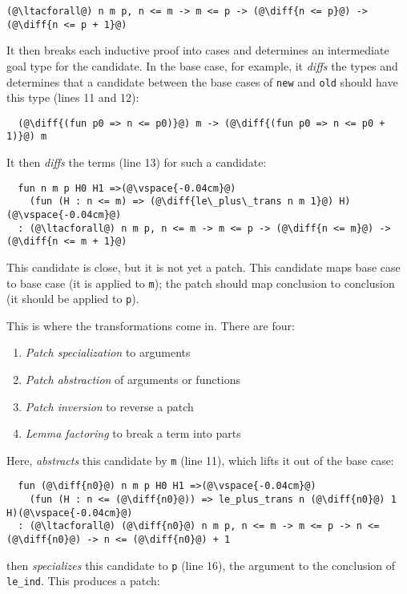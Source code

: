 \begin{lstlisting}[language=coq]
  (@\ltacforall@) n m p, n <= m -> m <= p -> (@\diff{n <= p}@) -> (@\diff{n <= p + 1}@)
\end{lstlisting}
It then breaks each inductive proof into cases and determines an intermediate goal type for the candidate.
In the base case, for example, it \textit{diffs} the types and determines that a candidate
between the base cases of \lstinline{new} and \lstinline{old} should have this type (lines 11 and 12):

\begin{lstlisting}
  (@\diff{(fun p0 => n <= p0)}@) m -> (@\diff{(fun p0 => n <= p0 + 1)}@) m
\end{lstlisting}
It then \textit{diffs} the terms (line 13) for such a candidate:

\begin{lstlisting}
  fun n m p H0 H1 =>(@\vspace{-0.04cm}@)
    (fun (H : n <= m) => (@\diff{le\_plus\_trans n m 1}@) H)(@\vspace{-0.04cm}@)
  : (@\ltacforall@) n m p, n <= m -> m <= p -> (@\diff{n <= m}@) -> (@\diff{n <= m + 1}@)
\end{lstlisting}

This candidate is close, but it is not yet a patch. This candidate
maps base case to base case (it is applied to \lstinline{m}); the patch should map conclusion to conclusion (it should
be applied to \lstinline{p}).

This is where the transformations come in.
There are four:

\begin{enumerate}
\item \textit{Patch specialization} to arguments
\item \textit{Patch abstraction} of arguments or functions
\item \textit{Patch inversion} to reverse a patch
\item \textit{Lemma factoring} to break a term into parts
\end{enumerate}

Here, \sysname \textit{abstracts} this candidate by \lstinline{m} (line 11), which lifts it out of the base case:

\begin{lstlisting}
  fun (@\diff{n0}@) n m p H0 H1 =>(@\vspace{-0.04cm}@)
    (fun (H : n <= (@\diff{n0}@)) => le_plus_trans n (@\diff{n0}@) 1 H)(@\vspace{-0.04cm}@)
  : (@\ltacforall@) (@\diff{n0}@) n m p, n <= m -> m <= p -> n <= (@\diff{n0}@) -> n <= (@\diff{n0}@) + 1
\end{lstlisting}
\sysname then \textit{specializes} this candidate to \lstinline{p} (line 16), the argument
to the conclusion of \lstinline{le_ind}. This produces a patch:


